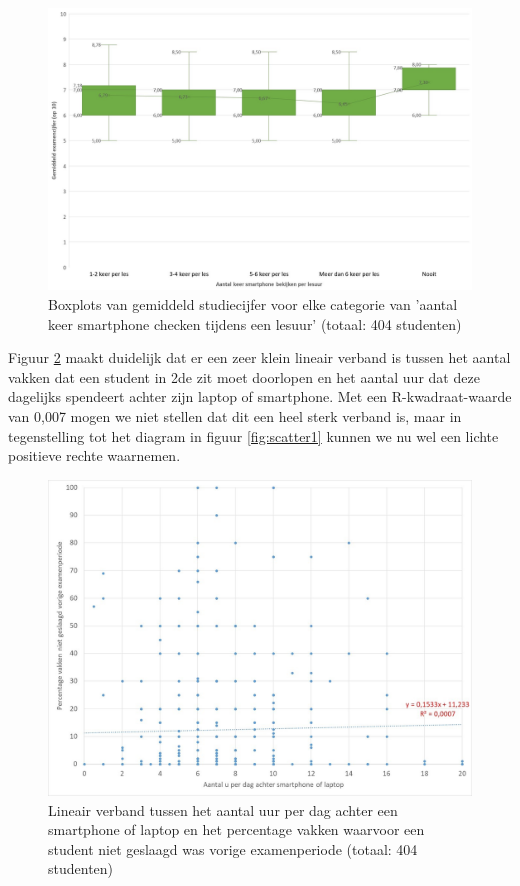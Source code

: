 \begin{figure}
	\includegraphics[width=\textwidth]
	{img/Boxplot1.jpg}
	\caption{Boxplots van gemiddeld studiecijfer voor elke categorie van 'aantal keer smartphone checken tijdens een lesuur' (totaal: 404 studenten)}
	\label{fig:boxplot1}
\end{figure}

Figuur \ref{fig:scatter2} maakt duidelijk dat er een zeer klein lineair verband is tussen het aantal vakken dat een student in 2de zit moet doorlopen en het aantal uur dat deze dagelijks spendeert achter zijn laptop of smartphone. Met een R-kwadraat-waarde van 0,007 mogen we niet stellen dat dit een heel sterk verband is, maar in tegenstelling tot het diagram in figuur \ref{fig:scatter1} kunnen we nu wel een lichte positieve rechte waarnemen.

\begin{figure}
	\includegraphics[width=\textwidth]
	{img/Scatter2.jpg}
	\caption{Lineair verband tussen het aantal uur per dag achter een smartphone of laptop en het percentage vakken waarvoor een student niet geslaagd was vorige examenperiode (totaal: 404 studenten)}
	\label{fig:scatter2}
\end{figure}

